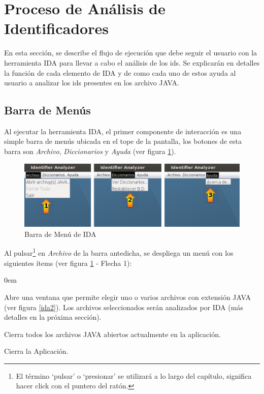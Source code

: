 \section{Proceso de Análisis de Identificadores}

En esta sección, se describe el flujo de ejecución que debe seguir el usuario con la herramienta IDA para llevar a cabo el análisis de los ids. Se explicarán en detalles la función de cada elemento de IDA y de como cada uno de estos ayuda al usuario a analizar los ids presentes en los archivo JAVA.

\subsection{Barra de Menús}

Al ejecutar la herramienta IDA, el primer componente de interacción es una simple barra de menús ubicada en el tope de la pantalla, los botones de esta barra son \textit{Archivo}, \textit{Diccionarios} y \textit{Ayuda} (ver figura \ref{ida1}). 

\begin{figure}[t] %
\centerline{%
\includegraphics[scale= 0.46]{./cap4/ida_01.png}
}
\caption{Barra de Menú de IDA}
\label{ida1}
\end{figure}

Al pulsar\footnote[1]{El término `pulsar' o `presionar' se utilizará a lo largo del capítulo, significa hacer click con el puntero del ratón.} en \textit{Archivo} de la barra antedicha, se despliega un menú con los siguientes ítems (ver figura \ref{ida1} - Flecha 1):

\begin{description}
\itemsep0em%
\item[Abrir archivo(s) JAVA:] Abre una ventana que permite elegir uno o varios archivos con extensión JAVA (ver figura \ref{ida2}). Los archivos seleccionados serán analizados por IDA (más detalles en la próxima sección).
\item[Cerrar Todo:] Cierra todos los archivos JAVA abiertos actualmente en la aplicación.
\item[Salir:] Cierra la Aplicación.
\end{description}

